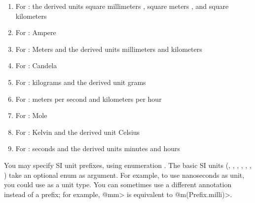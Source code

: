 \begin{enumerate}
\item For :
  the derived units
  square millimeters ,
  square meters , and
  square kilometers 

\item For :
  Ampere 

\item For :
  Meters 
  and the derived units
  millimeters  and
  kilometers 

\item For :
  Candela 

\item For :
  kilograms 
  and the derived unit
  grams 

\item For :
  meters per second  and
  kilometers per hour 

\item For :
  Mole 

\item For :
  Kelvin 
  and the derived unit
  Celsius 

\item For :
  seconds 
  and the derived units
  minutes  and
  hours 
\end{enumerate}


You may specify SI unit prefixes, using enumeration .
The basic SI units
(, , , , ,
 , )
take an optional  enum as argument.
For example, to use nanoseconds as unit, you could use
 as a unit type.
You can sometimes use a different annotation instead of a prefix;
for example, \<@mm> is equivalent to \<@m(Prefix.milli)>.

